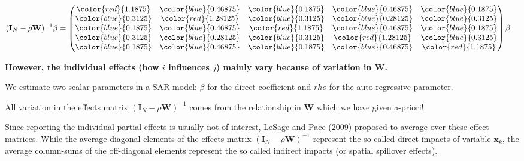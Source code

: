 \documentclass[
  letterpaper,
]{scrbook}
\begin{document}
\[
\begin{split}
(\boldsymbol{\mathbf{I}}_N - \rho \boldsymbol{\mathbf{W}})^{-1} \beta &=
\begin{pmatrix}
      \color{red}{1.1875} & \color{blue}{0.46875} & \color{blue}{0.1875} & \color{blue}{0.46875} & \color{blue}{0.1875} \\
      \color{blue}{0.3125} & \color{red}{1.28125} & \color{blue}{0.3125} & \color{blue}{0.28125} & \color{blue}{0.3125} \\
      \color{blue}{0.1875} & \color{blue}{0.46875} & \color{red}{1.1875} & \color{blue}{0.46875} & \color{blue}{0.1875} \\
      \color{blue}{0.3125} & \color{blue}{0.28125} & \color{blue}{0.3125} & \color{red}{1.28125} & \color{blue}{0.3125} \\
      \color{blue}{0.1875} & \color{blue}{0.46875} & \color{blue}{0.1875} & \color{blue}{0.46875} & \color{red}{1.1875}
      \end{pmatrix} \beta
\end{split}
\]

\textbf{However, the individual effects (how \(i\) influences \(j\))
mainly vary because of variation in \({\boldsymbol{\mathbf{W}}}\). }

\begin{tcolorbox}[enhanced jigsaw, colframe=quarto-callout-warning-color-frame, coltitle=black, titlerule=0mm, opacitybacktitle=0.6, toprule=.15mm, colbacktitle=quarto-callout-warning-color!10!white, toptitle=1mm, leftrule=.75mm, colback=white, bottomtitle=1mm, opacityback=0, left=2mm, title=\textcolor{quarto-callout-warning-color}{\faExclamationTriangle}\hspace{0.5em}{Do not interpret these as ``estimated'' individual impacts}, breakable, arc=.35mm, rightrule=.15mm, bottomrule=.15mm]

We estimate two scalar parameters in a SAR model: \(\beta\) for the
direct coefficient and \(rho\) for the auto-regressive parameter.

All variation in the effects matrix
\((\boldsymbol{\mathbf{I}}_N - \rho \boldsymbol{\mathbf{W}})^{-1}\)
\beta comes from the relationship in \(\boldsymbol{\mathbf{W}}\) which
we have given a-priori!

\end{tcolorbox}

Since reporting the individual partial effects is usually not of
interest, LeSage and Pace (2009) proposed to average over these effect
matrices. While the average diagonal elements of the effects matrix
\((\boldsymbol{\mathbf{I}}_N - \rho \boldsymbol{\mathbf{W}})^{-1}\)
represent the so called direct impacts of variable
\({\boldsymbol{\mathbf{x}}}_k\), the average column-sums of the
off-diagonal elements represent the so called indirect impacts (or
spatial spillover effects).
\end{document}
